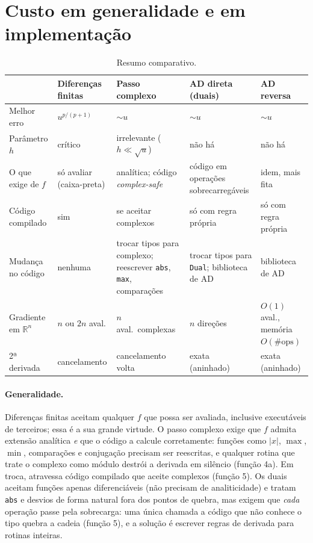 \documentclass[11pt,a4paper]{article}
\begin{document}
\section{Custo em generalidade e em implementação}

\begin{table}[h]
\centering\small
\begin{tabular}{p{2.6cm}p{2.5cm}p{2.9cm}p{2.9cm}p{2.5cm}}
\toprule
& Diferenças finitas & Passo complexo & AD direta (duais) & AD reversa \\
\midrule
Melhor erro & $u^{p/(p+1)}$ & $\sim u$ & $\sim u$ & $\sim u$ \\
Parâmetro $h$ & crítico & irrelevante ($h\ll\sqrt u$) & não há & não há \\
O que exige de $f$ & só avaliar (caixa-preta) & analítica; código \emph{complex-safe} & código em operações sobrecarregáveis & idem, mais fita \\
Código compilado & sim & se aceitar complexos & só com regra própria & só com regra própria \\
Mudança no código & nenhuma & trocar tipos para complexo; reescrever \texttt{abs}, \texttt{max}, comparações & trocar tipos para \texttt{Dual}; biblioteca de AD & biblioteca de AD \\
Gradiente em $\mathbb R^n$ & $n$ ou $2n$ aval. & $n$ aval.\ complexas & $n$ direções & $O(1)$ aval., memória $O(\#\text{ops})$ \\
2ª derivada & cancelamento & cancelamento volta & exata (aninhado) & exata (aninhado) \\
\bottomrule
\end{tabular}
\caption{Resumo comparativo.}
\end{table}

\paragraph{Generalidade.} Diferenças finitas aceitam qualquer $f$ que possa ser avaliada, inclusive executáveis de terceiros; essa é a sua grande virtude. O passo complexo exige que $f$ admita extensão analítica \emph{e} que o código a calcule corretamente: funções como $|x|$, $\max$, $\min$, comparações e conjugação precisam ser reescritas, e qualquer rotina que trate o complexo como módulo destrói a derivada em silêncio (função 4a). Em troca, atravessa código compilado que aceite complexos (função 5). Os duais aceitam funções apenas diferenciáveis (não precisam de analiticidade) e tratam \texttt{abs} e desvios de forma natural fora dos pontos de quebra, mas exigem que \emph{cada} operação passe pela sobrecarga: uma única chamada a código que não conhece o tipo quebra a cadeia (função 5), e a solução é escrever regras de derivada para rotinas inteiras.
\end{document}
